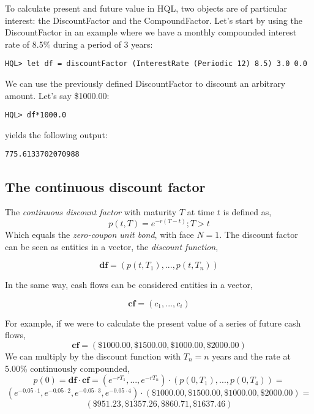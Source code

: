 \documentclass[11pt,a4paper]{article}
\numberwithin{equation}{section}
\begin{document}

To calculate present and future value in HQL, two objects are of particular interest:
the DiscountFactor and the CompoundFactor. Let's start by using the DiscountFactor in an example
where we have a monthly compounded interest rate of 8.5\% during a period of 3 years:
\FrameSep
\begin{lstlisting}
HQL> let df = discountFactor (InterestRate (Periodic 12) 8.5) 3.0 0.0
\end{lstlisting}
We can use the previously defined DiscountFactor to discount an arbitrary amount. Let's say
\$1000.00:
\FrameSep
\begin{lstlisting}
HQL> df*1000.0
\end{lstlisting}
yields the following output:
\FrameSep
\begin{lstlisting}[style=Output]
775.6133702070988
\end{lstlisting}

\subsection{The continuous discount factor}
The \textit{continuous discount factor} with maturity $T$ at time $t$ is defined as,
\[
p(t,T)=e^{-r(T-t)}; T>t
\]
Which equals the \textit{zero-coupon unit bond}, with face $N=1$. The discount factor
can be seen as entities in a vector, the \textit{discount function},

\[
\mathbf{df} = (p(t,T_1), ..., p(t,T_n))
\]

In the same way, cash flows can be considered entities in a vector,

\[
\mathbf{cf} = (c_1, ..., c_i)
\]

For example, if we were to calculate the present value of a series of future cash flows,
\[
\mathbf{cf} = (\$1000.00,\$1500.00,\$1000.00,\$2000.00)
\]
We can multiply by the discount function with $T_n=n$ years and the rate at 5.00\% continuously compounded,
\[
p(0) = \mathbf{df}\cdot\mathbf{cf} = (e^{-rT_1},...,e^{-rT_n})\cdot(p(0,T_1), ...,p(0,T_4))=
\]
\[
(e^{-0.05\cdot1},e^{-0.05\cdot2},e^{-0.05\cdot3},e^{-0.05\cdot4}) \cdot (\$1000.00,\$1500.00,\$1000.00,\$2000.00)=
\]
\[
(\$951.23,\$1357.26,\$860.71,\$1637.46)
\]
\end{document}
